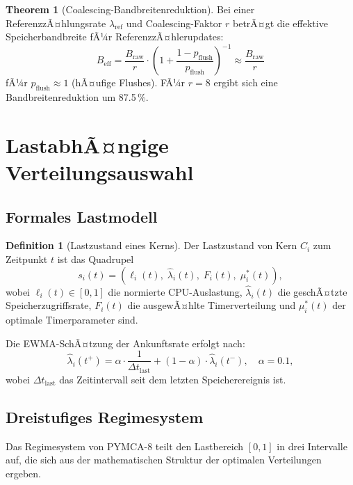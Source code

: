 ﻿\documentclass[a4paper,12pt]{scrreprt}
\theoremstyle{definition}
\newtheorem{definition}{Definition}[section]
\newtheorem{theorem}{Theorem}[section]
\begin{document}
	\begin{theorem}[Coalescing-Bandbreitenreduktion]
		\label{thm:coalescing}
		Bei einer ReferenzzÃ¤hlungsrate $\lambda_{\mathrm{ref}}$ und
		Coalescing-Faktor $r$ betrÃ¤gt die effektive Speicherbandbreite fÃ¼r
		ReferenzzÃ¤hlerupdates:
		\[
		B_{\mathrm{eff}} = \frac{B_{\mathrm{raw}}}{r} \cdot
		\left(1 + \frac{1-p_{\mathrm{flush}}}{p_{\mathrm{flush}}}\right)^{-1}
		\approx \frac{B_{\mathrm{raw}}}{r}
		\]
		fÃ¼r $p_{\mathrm{flush}} \approx 1$ (hÃ¤ufige Flushes). FÃ¼r $r=8$ ergibt
		sich eine Bandbreitenreduktion um 87.5\,\%.
	\end{theorem}
	
	\section{LastabhÃ¤ngige Verteilungsauswahl}
	
	\subsection{Formales Lastmodell}
	
	\begin{definition}[Lastzustand eines Kerns]
		\label{def:load}
		Der Lastzustand von Kern $C_i$ zum Zeitpunkt $t$ ist das Quadrupel
		\[
		s_i(t) = \left(\ell_i(t),\; \hat\lambda_i(t),\; F_i(t),\; \mu_i^*(t)\right),
		\]
		wobei $\ell_i(t) \in [0,1]$ die normierte CPU-Auslastung,
		$\hat\lambda_i(t)$ die geschÃ¤tzte Speicherzugriffsrate,
		$F_i(t)$ die ausgewÃ¤hlte Timerverteilung und
		$\mu_i^*(t)$ der optimale Timerparameter sind.
	\end{definition}
	
	Die EWMA-SchÃ¤tzung der Ankunftsrate erfolgt nach:
	\begin{equation}
		\hat\lambda_i(t^+) = \alpha \cdot \frac{1}{\Delta t_{\mathrm{last}}}
		+ (1-\alpha) \cdot \hat\lambda_i(t^-),
		\quad \alpha = 0.1,
		\label{eq:ewma}
	\end{equation}
	wobei $\Delta t_{\mathrm{last}}$ das Zeitintervall seit dem letzten
	Speicherereignis ist.
	
	\subsection{Dreistufiges Regimesystem}
	
	Das Regimesystem von PYMCA-8 teilt den Lastbereich $[0,1]$ in drei
	Intervalle auf, die sich aus der mathematischen Struktur der optimalen
	Verteilungen ergeben.
	
\end{document}
